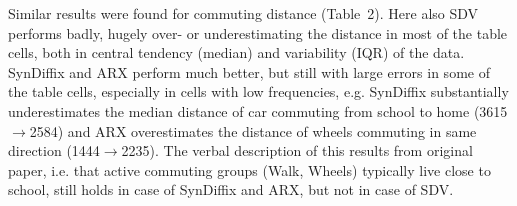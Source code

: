 \documentclass[10pt]{article}
\newif\ifcolor
\begin{document}
Similar results were found for commuting distance (Table~2). Here also SDV performs badly, hugely over- or underestimating the distance in most of the table cells, both in central tendency (median) and variability (IQR) of the data. SynDiffix and ARX perform much better, but still with large errors in some of the table cells, especially in cells with low frequencies, e.g. SynDiffix substantially underestimates the median distance of car commuting from school to home (3615$\rightarrow$2584) and ARX overestimates the distance of wheels commuting in same direction (1444$\rightarrow$2235). The verbal description of this results from original paper, i.e. that active commuting groups (Walk, Wheels) typically live
close to school, still holds in case of SynDiffix and ARX, but not in case of SDV.

%
%
%

\end{document}
